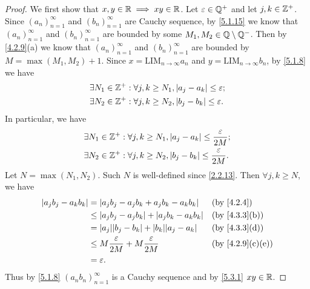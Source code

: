 \begin{proof}
  We first show that \(x, y \in \mathbb{R} \implies xy \in \mathbb{R}\).
  Let \(\varepsilon \in \mathbb{Q}^+\) and let \(j, k \in \mathbb{Z}^+\).
  Since \((a_n)_{n = 1}^\infty\) and \((b_n)_{n = 1}^\infty\) are Cauchy sequence, by \cref{5.1.15} we know that \((a_n)_{n = 1}^\infty\) and \((b_n)_{n = 1}^\infty\) are bounded by some \(M_1, M_2 \in \mathbb{Q} \setminus \mathbb{Q}^-\).
  Then by \cref{4.2.9}(a) we know that \((a_n)_{n = 1}^\infty\) and \((b_n)_{n = 1}^\infty\) are bounded by \(M = \max(M_1, M_2) + 1\).
  Since \(x = \text{LIM}_{n \to \infty} a_n\) and \(y = \text{LIM}_{n \to \infty} b_n\), by \cref{5.1.8} we have
  \begin{align*}
     & \exists N_1 \in \mathbb{Z}^+ : \forall j, k \geq N_1, \left\lvert a_j - a_k\right\rvert \leq \varepsilon; \\
     & \exists N_2 \in \mathbb{Z}^+ : \forall j, k \geq N_2, \left\lvert b_j - b_k\right\rvert \leq \varepsilon.
  \end{align*}
  In particular, we have
  \begin{align*}
     & \exists N_1 \in \mathbb{Z}^+ : \forall j, k \geq N_1, \left\lvert a_j - a_k\right\rvert \leq \dfrac{\varepsilon}{2M}; \\
     & \exists N_2 \in \mathbb{Z}^+ : \forall j, k \geq N_2, \left\lvert b_j - b_k\right\rvert \leq \dfrac{\varepsilon}{2M}.
  \end{align*}
  Let \(N = \max(N_1, N_2)\).
  Such \(N\) is well-defined since \cref{2.2.13}.
  Then \(\forall j, k \geq N\), we have
  \begin{align*}
    \abs{a_j b_j - a_k b_k} & = \abs{a_j b_j - a_j b_k + a_j b_k - a_k b_k}              &  & \by{4.2.4}                     \\
                            & \leq \abs{a_j b_j - a_j b_k} + \abs{a_j b_k - a_k b_k}     &  & \text{(by \cref{4.3.3}(b))}    \\
                            & = \abs{a_j} \abs{b_j - b_k} + \abs{b_k} \abs{a_j - a_k}    &  & \text{(by \cref{4.3.3}(d))}    \\
                            & \leq M \dfrac{\varepsilon}{2M} + M \dfrac{\varepsilon}{2M} &  & \text{(by \cref{4.2.9}(c)(e))} \\
                            & = \varepsilon.
  \end{align*}
  Thus by \cref{5.1.8} \((a_n b_n)_{n = 1}^\infty\) is a Cauchy sequence and by \cref{5.3.1} \(xy \in \mathbb{R}\).


\end{proof}
